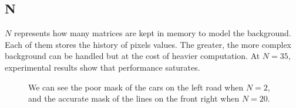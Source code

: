 \subsection*{N}
$N$ represents how many matrices are kept in memory to model the background.
Each of them stores the history of pixels values.
The greater, the more complex background can be handled but at the cost of heavier
computation. At $N=35$, experimental results show that performance saturates.
\begin{figure}[!t]
\centering
{}
\newline
{}
\newline
{}
\caption{We can see the poor mask of the cars on the left road when $N=2$, and the
accurate mask of the lines on the front right when $N=20$.}
\end{figure}


